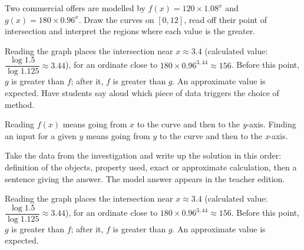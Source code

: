 \begin{activity}
Two commercial offers are modelled by $f(x)=120\times\num{1,08}^x$ and $g(x)=180\times\num{0,96}^x$. Draw the curves on $[0,12]$, read off their point of intersection and interpret the regions where each value is the greater.
\begin{center}\end{center}
\end{activity}
\begin{solution}Reading the graph places the intersection near $x\approx\num{3,4}$ (calculated value: $\dfrac{\log\num{1,5}}{\log\num{1,125}}\approx\num{3,44}$), for an ordinate close to $\num{180}\times\num{0,96}^{3,44}\approx\num{156}$. Before this point, $g$ is greater than $f$; after it, $f$ is greater than $g$. An approximate value is expected. Have students say aloud which piece of data triggers the choice of method.\end{solution}

\begin{summary}Reading $f(x)$ means going from $x$ to the curve and then to the \textit{y}-axis. Finding an input for a given $y$ means going from $y$ to the curve and then to the \textit{x}-axis.\end{summary}

\begin{example}
Take the data from the investigation and write up the solution in this order: definition of the objects, property used, exact or approximate calculation, then a sentence giving the answer. The model answer appears in the teacher edition.
\end{example}
\begin{solution}Reading the graph places the intersection near $x\approx\num{3,4}$ (calculated value: $\dfrac{\log\num{1,5}}{\log\num{1,125}}\approx\num{3,44}$), for an ordinate close to $\num{180}\times\num{0,96}^{3,44}\approx\num{156}$. Before this point, $g$ is greater than $f$; after it, $f$ is greater than $g$. An approximate value is expected.\end{solution}

